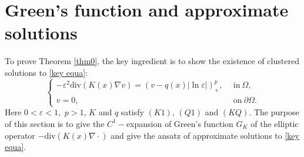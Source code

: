 \documentclass[12pt,reqno]{amsart}
\numberwithin{equation}{section}
\theoremstyle{definition}
\theoremstyle{remark}
\begin{document}
\section{Green's function and approximate solutions}

To  prove Theorem \ref{thm0}, the key ingredient is to show the existence of clustered solutions to \eqref{key equa}:
\begin{equation*} 
\begin{cases}
-\varepsilon^2\text{div}(K(x)\nabla v)=  \left (v-q(x)|\ln\varepsilon| \right )^{p}_+,\ \ &\text{in}\  \Omega,\\
v=0,\ \ &\text{on}\ \partial \Omega.
\end{cases}
\end{equation*}
Here $ 0<\varepsilon<1, $ $ p>1 $, $ K $ and $ q $ satisfy $(K1)$, $ (Q1) $ and $ (KQ) $. %
The purpose of this section is to give the $ C^1-$expansion of Green's function $ G_{K} $ of the elliptic operator $  -\text{div}(K(x)\nabla \cdot) $ and give the ansatz of  approximate solutions to \eqref{key equa}. %
\end{document}
